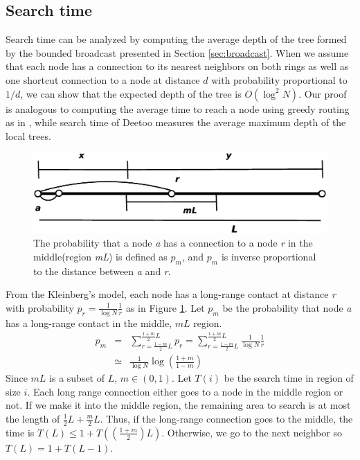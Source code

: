 \documentclass[conference]{IEEEtran}
\begin{document}
\subsection{Search time}
\label{sec:search_time}
Search time can be analyzed by computing the average
depth of the tree formed by the bounded broadcast presented in
Section \ref{sec:broadcast}. When we assume that each node 
has a connection to its nearest neighbors on both rings as well as
one shortcut connection to a node at distance $d$ with probability
proportional to $1/d$, we can show that the expected depth of the 
tree is $O(\log^2 N)$. 
Our proof is analogous to computing the average time 
to reach a node using greedy routing as in \cite{jk:Information,
pr:Symphony}, while search time of 
Deetoo measures the average maximum depth of the local trees.
\begin{figure}
\centering
\includegraphics[width=2.5 in]{searchtime}
\caption{The probability that a node \textit{a} has a connection to a node \textit{r} 
in the middle(region \textit{mL}) is defined as $p_{m}$, and $p_m$ is inverse 
proportional to the distance between \textit{a} and \textit{r}.} \label{fig:search}
\end{figure}
From the Kleinberg's model, each node has a long-range
contact at distance \textit{r} with probability 
$p_{r}=\frac{1}{\log N}\frac{1}{r}$ as in Figure \ref{fig:search}. 
Let \textit{$p_{m}$} be the probability that node \textit{a} has a long-range
contact in the middle, \textit{$mL$} region.
\begin{eqnarray*}
p_{m} &=& \sum_{r=\frac{1-m}{2}L}^{\frac{1+m}{2}L}p_{r} = \sum_{r=\frac{1-m}{2}L}^{\frac{1+m}{2}L}\frac{1}{\log
        N}\frac{1}{r}\\
        &\simeq& \frac{1}{\log N}\log\left(\frac{1+m}{1-m}\right)
\end{eqnarray*}
Since \textit{$mL$} is a subset of \textit{$L$},
$m\in (0,1)$. 
Let $T(i)$ be the search time in region of size $i$.
Each long range connection either goes to a node in the
middle region or not.
If we make it into the middle region, the remaining area
to search is at most the length of $\frac{1}{2}L + \frac{m}{2}L$.
Thus,
if the long-range connection goes to the middle, the time is 
$T(L) \leq 1 + T((\frac{1+m}{2})L)$. 
Otherwise, we go to the next neighbor so $T(L) = 1 + T(L-1)$.
\end{document}
